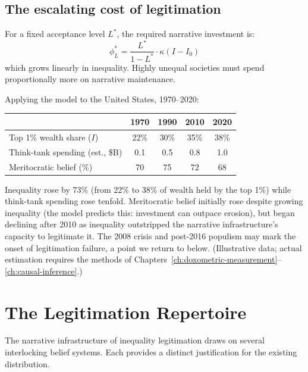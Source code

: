 \subsection{The escalating cost of legitimation}

\begin{proposition}
\label{prop:escalation}
For a fixed acceptance level $L^*$, the required narrative investment is:
\[
  \phi_L^* = \frac{L^*}{1 - L^*} \cdot \kappa(I - I_0)
\]
which grows linearly in inequality.
Highly unequal societies must spend proportionally more on narrative maintenance.
\end{proposition}

\begin{example}
\label{ex:legitimation-cost-us}
Applying the model to the United States, 1970--2020:

\begin{center}
\begin{tabular}{lcccc}
\toprule
& 1970 & 1990 & 2010 & 2020 \\
\midrule
Top 1\% wealth share ($I$) & 22\% & 30\% & 35\% & 38\% \\
Think-tank spending (est., \$B) & 0.1 & 0.5 & 0.8 & 1.0 \\
Meritocratic belief (\%) & 70 & 75 & 72 & 68 \\
\bottomrule
\end{tabular}
\end{center}

Inequality rose by 73\% (from 22\% to 38\% of wealth held by the top 1\%) while think-tank spending rose tenfold.
Meritocratic belief initially rose despite growing inequality (the model predicts this: investment can outpace erosion), but began declining after 2010 as inequality outstripped the narrative infrastructure's capacity to legitimate it.
The 2008 crisis and post-2016 populism may mark the onset of legitimation failure, a point we return to below.
(Illustrative data; actual estimation requires the methods of Chapters~\ref{ch:doxometric-measurement}--\ref{ch:causal-inference}.)
\end{example}

\section{The Legitimation Repertoire}
\label{sec:ch24-repertoire}

The narrative infrastructure of inequality legitimation draws on several interlocking belief systems.
Each provides a distinct justification for the existing distribution.

